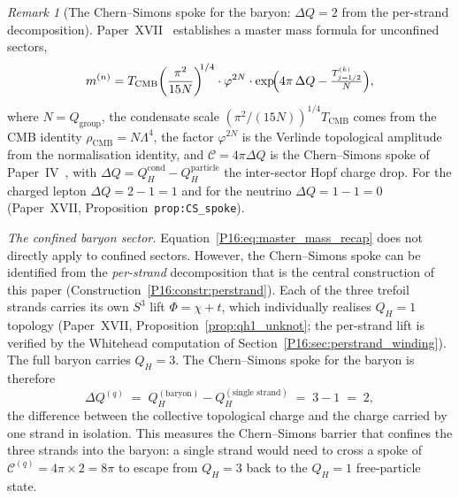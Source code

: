 \documentclass[11pt,a4paper]{article}
\theoremstyle{definition}\newtheorem{definition}[theorem]{Definition}
\theoremstyle{remark}
\newtheorem{remark}[theorem]{Remark}
\theoremstyle{definition}\newtheorem{construction}[theorem]{Construction}
\newcommand{\vp}{\varphi}
\newcommand{\TCMB}{T_{\mathrm{CMB}}}
\newcommand{\QH}{Q_H}
\begin{document}
\begin{remark}[The Chern--Simons spoke for the baryon: $\Delta Q=2$ from the per-strand decomposition]
\label{P16:rem:cs_spoke_quark}
Paper~XVII~\cite{Paper17} establishes a master mass formula for
unconfined sectors,
\begin{equation}
  m^{(n)} = \TCMB\!\left(\frac{\pi^2}{15N}\right)^{\!\!1/4}
  \cdot\vp^{2N}
  \cdot\exp\!\Bigl(4\pi\,\Delta Q - \tfrac{T_{j=1/2}^{(k)}}{N}\Bigr),
  \label{P16:eq:master_mass_recap}
\end{equation}
where $N=Q_{\mathrm{group}}$, the condensate scale
$(\pi^2/(15N))^{1/4}\TCMB$ comes from the CMB identity
$\rho_{\mathrm{CMB}}=N\Lambda^4$, the factor $\vp^{2N}$ is the
Verlinde topological amplitude from the normalisation identity, and
$\mathcal{C}=4\pi\Delta Q$ is the Chern--Simons spoke of
Paper~IV~\cite{Paper4}, with $\Delta Q=Q_H^{\mathrm{cond}}-Q_H^{\mathrm{particle}}$
the inter-sector Hopf charge drop.  For the charged lepton
$\Delta Q=2-1=1$ and for the neutrino $\Delta Q=1-1=0$ (Paper~XVII,
Proposition~\texttt{prop:CS\_spoke}).

\emph{The confined baryon sector.}
Equation~\eqref{P16:eq:master_mass_recap} does not directly apply to
confined sectors.  However, the Chern--Simons spoke can be identified
from the \emph{per-strand} decomposition that is the central
construction of this paper (Construction~\ref{P16:constr:perstrand}).
Each of the three trefoil strands carries its own $S^3$ lift
$\Phi=\chi+t$, which individually realises $\QH=1$ topology
(Paper~XVII, Proposition~\ref{prop:qh1_unknot}; the per-strand lift
is verified by the Whitehead computation of
Section~\ref{P16:sec:perstrand_winding}).  The full baryon carries
$\QH=3$.  The Chern--Simons spoke for the baryon is therefore
\begin{equation}
  \Delta Q^{(q)}
  \;=\; Q_H^{(\text{baryon})} - Q_H^{(\text{single strand})}
  \;=\; 3 - 1
  \;=\; 2,
  \label{P16:eq:DeltaQ_quark}
\end{equation}
the difference between the collective topological charge and the
charge carried by one strand in isolation.  This measures the
Chern--Simons barrier that confines the three strands into the
baryon: a single strand would need to cross a spoke of
$\mathcal{C}^{(q)}=4\pi\times2=8\pi$ to escape from $\QH=3$ back
to the $\QH=1$ free-particle state.


\end{remark}
\end{document}
